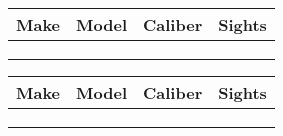 \documentclass[10pt,a5paper,landscape, margin=1in]{article}
\author{DC Metro Socialist Rifle Association}
\begin{document}
\begin{minipage}{.5\textwidth}
\begin{center}
    \begin{tabular}{ | p{1.5cm} | p{1.5cm} | l | l |}
    \hline
    Make & Model & Caliber & Sights \\ 
    \hline
     &  &  &  \\[1cm] 
     \hline
     &  &  &  \\ 
     \hline
     &  &  &  \\
    \hline
    \end{tabular}
\end{center}
\end{minipage}
\begin{minipage}{.5\textwidth}
\begin{center}
    \begin{tabular}{ | p{1.5cm} | p{1.5cm} | l | l |}
    \hline
    Make & Model & Caliber & Sights \\ 
    \hline
     &  &  &  \\ 
     \hline
     &  &  &  \\ 
     \hline
     &  &  &  \\
    \hline
    \end{tabular}
\end{center}

\end{minipage}
\end{document}
